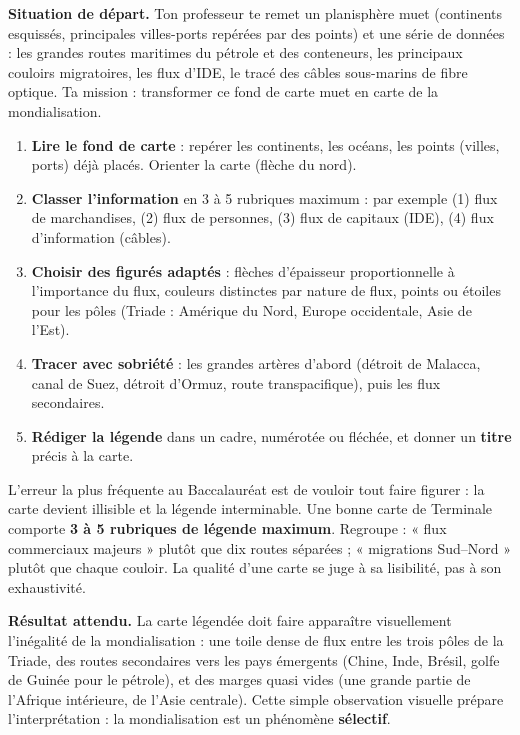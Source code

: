\documentclass[11pt]{article}
\newcommand{\cle}[1]{{\popxbold\color{popdark}#1}}
\newcounter{popsec}
\newcounter{popsub}
\newcommand{\courssub}[1]{%
  \stepcounter{popsub}%
  \par\vspace{9pt}\noindent{\popxbold\fontsize{11.5}{13}\selectfont\color{popink}{\color{poporange}\thepopsec.\thepopsub}\hspace{6pt}#1}\par\nopagebreak\vspace{4pt}
}
\begin{document}
\courssub{TP 1 : Légender une carte mondiale des flux}

\textbf{Situation de départ.} Ton professeur te remet un planisphère muet (continents esquissés, principales villes-ports repérées par des points) et une série de données : les grandes routes maritimes du pétrole et des conteneurs, les principaux couloirs migratoires, les flux d'IDE, le tracé des câbles sous-marins de fibre optique. Ta mission : transformer ce fond de carte muet en \cle{carte de la mondialisation}.

\begin{methode}
\begin{enumerate}
\item \textbf{Lire le fond de carte} : repérer les continents, les océans, les points (villes, ports) déjà placés. Orienter la carte (flèche du nord).
\item \textbf{Classer l'information} en 3 à 5 rubriques maximum : par exemple (1) flux de marchandises, (2) flux de personnes, (3) flux de capitaux (IDE), (4) flux d'information (câbles).
\item \textbf{Choisir des figurés adaptés} : flèches d'épaisseur proportionnelle à l'importance du flux, couleurs distinctes par nature de flux, points ou étoiles pour les pôles (Triade : Amérique du Nord, Europe occidentale, Asie de l'Est).
\item \textbf{Tracer avec sobriété} : les grandes artères d'abord (détroit de Malacca, canal de Suez, détroit d'Ormuz, route transpacifique), puis les flux secondaires.
\item \textbf{Rédiger la légende} dans un cadre, numérotée ou fléchée, et donner un \textbf{titre} précis à la carte.
\end{enumerate}
\end{methode}

\begin{attention}
L'erreur la plus fréquente au Baccalauréat est de vouloir tout faire figurer : la carte devient illisible et la légende interminable. Une bonne carte de Terminale comporte \textbf{3 à 5 rubriques de légende maximum}. Regroupe : « flux commerciaux majeurs » plutôt que dix routes séparées ; « migrations Sud--Nord » plutôt que chaque couloir. La qualité d'une carte se juge à sa \cle{lisibilité}, pas à son exhaustivité.
\end{attention}

\textbf{Résultat attendu.} La carte légendée doit faire apparaître visuellement l'\cle{inégalité} de la mondialisation : une toile dense de flux entre les trois pôles de la Triade, des routes secondaires vers les pays émergents (Chine, Inde, Brésil, golfe de Guinée pour le pétrole), et des marges quasi vides (une grande partie de l'Afrique intérieure, de l'Asie centrale). Cette simple observation visuelle prépare l'interprétation : la mondialisation est un phénomène \textbf{sélectif}.
\end{document}
